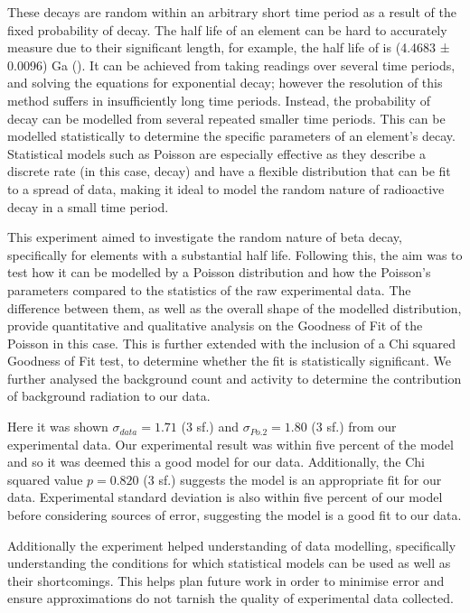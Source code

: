 \documentclass[11pt]{article}
\begin{document}
\noindent These decays are random within an arbitrary short time period as a result of the fixed probability of decay. The half life of an element can be hard to accurately measure due to their significant length, for example, the half life of  is (4.4683 ± 0.0096) Ga (\cite{U238}).  It can be achieved from taking readings over several time periods, and solving the equations for exponential decay; however the resolution of this method suffers in insufficiently long time periods. Instead, the probability of decay can be modelled from several repeated smaller time periods. This can be modelled statistically to determine the  specific parameters of an element's decay. Statistical models such as Poisson are especially effective as they describe a discrete rate (in this case, decay) and have a flexible distribution that can be fit to a spread of data, making it ideal to model the random nature of radioactive decay in a small time period. 
    
\noindent This experiment aimed to investigate the random nature of beta decay, specifically for elements with a substantial half life. Following this, the aim was to test how it can be modelled by a Poisson distribution and how the Poisson's parameters compared to the statistics of the raw experimental data. The difference between them, as well as the overall shape of the modelled distribution, provide quantitative and qualitative analysis on the Goodness of Fit of the Poisson in this case. This is further extended with the inclusion of a Chi squared Goodness of Fit test, to determine whether the fit is statistically significant.  We further analysed the background count and activity to determine the contribution of background radiation to our data. 
    
\noindent Here it was shown $\sigma_{data} = 1.71$ (3 sf.) and $\sigma_{Po.2} = 1.80$ (3 sf.) from our experimental data. Our experimental result was within five percent of the model and so it was deemed this a good model for our data. Additionally, the Chi squared value $p = 0.820$ (3 sf.) suggests the model is an appropriate fit for our data. Experimental standard deviation is also within five percent of our model before considering sources of error, suggesting the model is a good fit to our data. 
    
\noindent Additionally the experiment helped understanding of data modelling, specifically understanding the conditions for which statistical models can be used as well as their shortcomings. This helps plan future work in order to minimise error and ensure approximations do not tarnish the quality of experimental data collected.  
\end{document}
